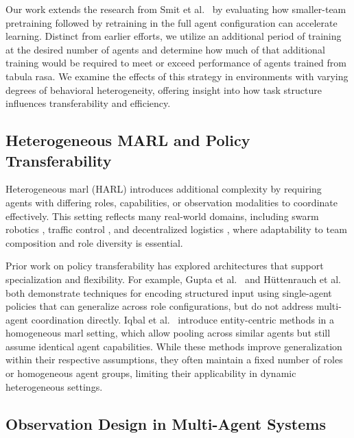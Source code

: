 \documentclass{article}
\begin{document}
Our work extends the research from Smit et al.~\cite{smit2023}
by evaluating how smaller-team pretraining followed 
by retraining in the full agent configuration can accelerate learning. 
Distinct from earlier efforts, we utilize an additional period of training at 
the desired number of agents and determine how much of that additional training would 
be required to meet or exceed performance of agents trained from tabula rasa.
We examine the effects of this strategy in environments with varying degrees of 
behavioral heterogeneity, offering insight into how task structure influences 
transferability and efficiency.

\subsection{Heterogeneous MARL and Policy Transferability}

Heterogeneous \gls{marl} (HARL) introduces additional complexity by requiring agents with 
differing roles, capabilities, or observation modalities to coordinate effectively. 
This setting reflects many real-world domains, including swarm robotics \cite{hoang2023}, 
traffic control \cite{calvo2018}, and decentralized logistics \cite{rizk2019}, 
where adaptability to team composition and role diversity is essential.

Prior work on policy transferability has explored architectures that support specialization 
and flexibility. For example, Gupta et al.~\cite{gupta2017a} and H{\"u}ttenrauch 
et al.~\cite{huttenrauch2019} both demonstrate techniques for encoding structured input 
using single-agent policies that can generalize across role configurations, but do not 
address multi-agent coordination directly. Iqbal et al.~\cite{iqbal2021} introduce 
entity-centric methods in a homogeneous \gls{marl} setting, which allow pooling across similar 
agents but still assume identical agent capabilities. While these methods improve 
generalization within their respective assumptions, they often maintain a fixed number of roles 
or homogeneous agent groups, limiting their applicability in dynamic heterogeneous settings.


\subsection{Observation Design in Multi-Agent Systems}
\label{con1:sec:related_work-observation_design}
\end{document}
